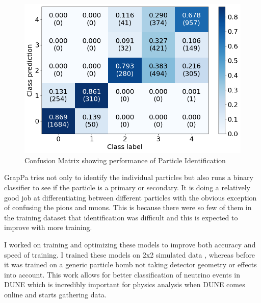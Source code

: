 \begin{figure}[H]
  \centering
  \includegraphics[width=120mm]{figures/pidPerformance.png}
  \caption{Confusion Matrix showing performance of Particle Identification}
  \label{pidPerformance}
\end{figure}

GrapPa tries not only to identify the individual particles but also runs a binary classifier to see if the particle is a primary or secondary.
It is doing a relatively good job at differentiating between different particles with the obvious exception of confusing the pions and muons.
This is because there were so few of them  in the training dataset that identification was difficult and this is expected to improve with more training.

I worked on training and optimizing these models to improve both accuracy and speed of training.
I trained these models on 2x2 simulated data , whereas before it was trained on a generic particle bomb not taking detector geometry or effects into account.
This work allows for better classification of neutrino events in DUNE which is incredibly important for physics analysis when DUNE comes online and starts gathering data.